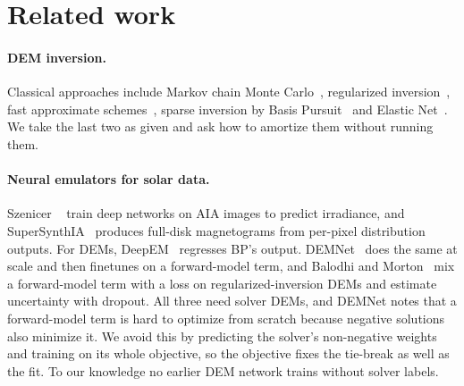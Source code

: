 \section{Related work}
\label{sec:related}

\paragraph{DEM inversion.}
Classical approaches include Markov chain Monte Carlo~\cite{kashyap1998mcmc}, regularized inversion~\cite{hannah2012regularized}, fast approximate schemes~\cite{plowman2013fast,plowman2020simple}, sparse inversion by Basis Pursuit~\cite{cheung2015dem,chen1998basis} and Elastic Net~\cite{athiray2024enet,zou2005elastic}. We take the last two as given and ask how to amortize them without running them.

\paragraph{Neural emulators for solar data.}
Szenicer \etal~\cite{szenicer2019virtual} train deep networks on AIA images to predict irradiance, and SuperSynthIA~\cite{wang2024supersynthia} produces full-disk magnetograms from per-pixel distribution outputs. For DEMs, DeepEM~\cite{wright2019deepem} regresses BP's output. DEMNet~\cite{perezdiaz2026demnet} does the same at scale and then finetunes on a forward-model term, and Balodhi and Morton~\cite{bayesdem2026} mix a forward-model term with a loss on regularized-inversion DEMs and estimate uncertainty with dropout. All three need solver DEMs, and DEMNet notes that a forward-model term is hard to optimize from scratch because negative solutions also minimize it. We avoid this by predicting the solver's non-negative weights and training on its whole objective, so the objective fixes the tie-break as well as the fit. To our knowledge no earlier DEM network trains without solver labels.


